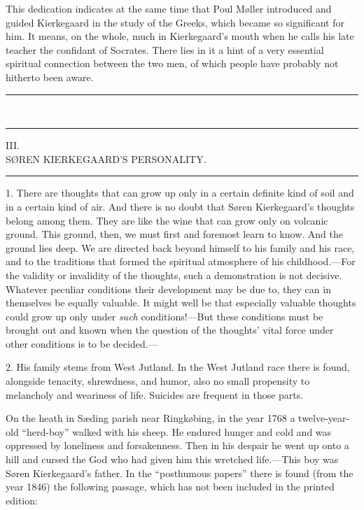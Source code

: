 \documentclass[12pt,a4paper]{book}
\newcommand{\opage}[1]{\marginnote{\footnotesize\textit{[#1]}}}
\begin{document}
This dedication indicates at the same time that Poul Møller introduced and
guided Kierkegaard in the study of the Greeks, which
\opage{27}became so significant for him. It means, on the whole, much in
Kierkegaard's mouth when he calls his late teacher the confidant of
Socrates. There lies in it a hint of a very essential spiritual
connection between the two men, of which people have probably not
hitherto been aware.
\begin{center}\rule{2cm}{0.4pt}\\[-8pt]\rule{2cm}{0.4pt}\end{center}

\opage{28}\begin{center}III.\\[4pt] SØREN KIERKEGAARD'S PERSONALITY.\\[4pt]\rule{1.5cm}{0.4pt}\end{center}

1. There are thoughts that can grow up only in a certain definite kind of
soil and in a certain kind of air. And there is no doubt that Søren
Kierkegaard's thoughts belong among them. They are like the wine that can
grow only on volcanic ground. This ground, then, we must first and
foremost learn to know. And the ground lies deep. We are directed back
beyond himself to his family and his race, and to the traditions that
formed the spiritual atmosphere of his childhood.---For the validity or
invalidity of the thoughts, such a demonstration is not decisive. Whatever
peculiar conditions their development may be due to, they can in
themselves be equally valuable. It might well be that especially valuable
thoughts could grow up only under \textit{such} conditions!---But these
conditions must be brought out and known when the question of the
thoughts' vital force under other conditions is to be decided.---

2. His family stems from West Jutland. In the West Jutland race there is
found, alongside tenacity, shrewdness, and humor, also no small
propensity to melancholy and weariness of life. Suicides are frequent in
those parts.

On the heath in Sæding parish near Ringkøbing, in the year 1768 a
twelve-year-old ``herd-boy'' walked with his sheep.
\opage{29}He endured hunger and cold and was oppressed by loneliness and
forsakenness. Then in his despair he went up onto a hill and cursed the
God who had given him this wretched life.---This boy was Søren
Kierkegaard's father. In the ``posthumous papers'' there is found (from
the year 1846) the following passage, which has not been included in the
printed edition:
\end{document}
